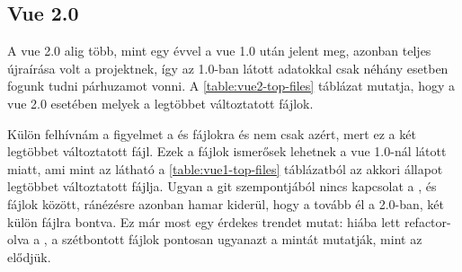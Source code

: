 \pagebreak

\subsection{Vue 2.0}

A vue 2.0 alig több, mint egy évvel a vue 1.0 után jelent meg, azonban teljes újraírása volt a projektnek, így az 1.0-ban látott adatokkal csak néhány esetben fogunk tudni párhuzamot vonni. A \ref{table:vue2-top-files} táblázat mutatja, hogy a vue 2.0 esetében melyek a legtöbbet változtatott fájlok.

Külön felhívnám a figyelmet a  és  fájlokra és nem csak azért, mert ez a két legtöbbet változtatott fájl. Ezek a fájlok ismerősek lehetnek a vue 1.0-nál látott  miatt, ami mint az látható a \ref{table:vue1-top-files} táblázatból az akkori állapot legtöbbet változtatott fájlja. Ugyan a git szempontjából nincs kapcsolat a ,  és  fájlok között, ránézésre azonban hamar kiderül, hogy a  tovább él a 2.0-ban, két külön fájlra bontva. Ez már most egy érdekes trendet mutat: hiába lett refactor-olva a , a szétbontott fájlok pontosan ugyanazt a mintát mutatják, mint az elődjük.


